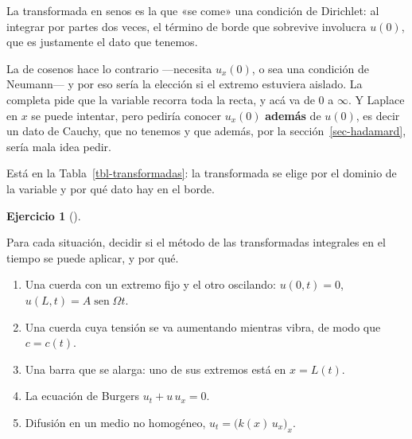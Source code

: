 \documentclass[
  spanish,
  a4paper,
]{scrbook}
\providecommand{\tightlist}{%
  \setlength{\itemsep}{0pt}\setlength{\parskip}{0pt}}
\theoremstyle{definition}
\theoremstyle{plain}
\theoremstyle{definition}
\theoremstyle{plain}
\theoremstyle{definition}
\newtheorem{exercise}{Ejercicio}[chapter]
\theoremstyle{remark}
\begin{document}
La transformada en senos es la que «se come» una condición de Dirichlet:
al integrar por partes dos veces, el término de borde que sobrevive
involucra \(u(0)\), que es justamente el dato que tenemos.

La de cosenos hace lo contrario ---necesita \(u_x(0)\), o sea una
condición de Neumann--- y por eso sería la elección si el extremo
estuviera aislado. La completa pide que la variable recorra toda la
recta, y acá va de \(0\) a \(\infty\). Y Laplace en \(x\) se puede
intentar, pero pediría conocer \(u_x(0)\) \textbf{además} de \(u(0)\),
es decir un dato de Cauchy, que no tenemos y que además, por la
sección~\ref{sec-hadamard}, sería mala idea pedir.

Está en la Tabla~\ref{tbl-transformadas}: la transformada se elige por
el dominio de la variable y por qué dato hay en el borde.

\begin{exercise}[]\protect\hypertarget{exr-transformada-requisitos}{}\label{exr-transformada-requisitos}

Para cada situación, decidir si el método de las transformadas
integrales en el tiempo se puede aplicar, y por qué.

\begin{enumerate}
\def\labelenumi{\alph{enumi}.}
\tightlist
\item
  Una cuerda con un extremo fijo y el otro oscilando: \(u(0,t)=0\),
  \(u(L,t)=A\operatorname{sen}\Omega t\).
\item
  Una cuerda cuya tensión se va aumentando mientras vibra, de modo que
  \(c = c(t)\).
\item
  Una barra que se alarga: uno de sus extremos está en \(x = L(t)\).
\item
  La ecuación de Burgers \(u_t + u\,u_x = 0\).
\item
  Difusión en un medio no homogéneo, \(u_t = \big(k(x)\,u_x\big)_x\).
\end{enumerate}

\end{exercise}
\end{document}
